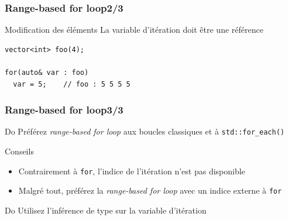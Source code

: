 \documentclass[C++.tex]{subfiles}
\begin{document}
\begin{frame}[fragile]
	\frametitle{Range-based for loop\titlehfill{}2/3}
	\begin{alertblock}{Modification des éléments}
		La variable d'itération doit être une référence
	\end{alertblock}

	\begin{lstlisting}
vector<int> foo(4);

for(auto& var : foo)
  var = 5;    // foo : 5 5 5 5\end{lstlisting}
\end{frame}

\begin{frame}
	\frametitle{Range-based for loop\titlehfill{}3/3}
	\begin{exampleblock}{Do}
		Préférez \textit{range-based for loop} aux boucles classiques et à \lstinline|std::for_each()|
	\end{exampleblock}


	\begin{block}{Conseils}
		\begin{itemize}
			\item Contrairement à \lstinline|for|, l'indice de l'itération n'est pas disponible
			\item Malgré tout, préférez la \textit{range-based for loop} avec un indice externe à \lstinline|for|

		\end{itemize}
	\end{block}

	\begin{exampleblock}{Do}
		Utilisez l'inférence de type sur la variable d'itération
	\end{exampleblock}
\end{frame}
\end{document}
